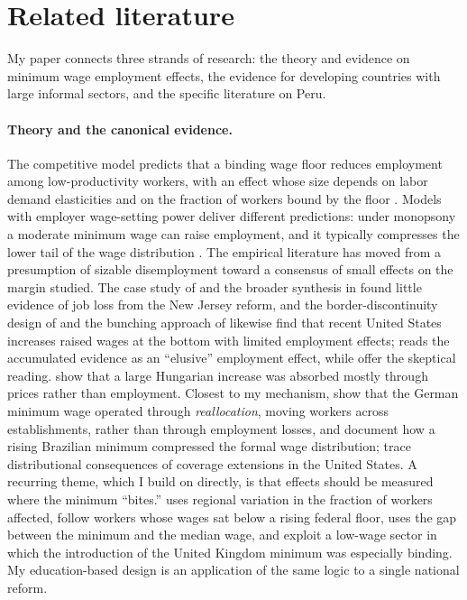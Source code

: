 \section{Related literature}\label{sec:literature}

My paper connects three strands of research: the theory and evidence on minimum wage employment effects, the evidence for developing countries with large informal sectors, and the specific literature on Peru.

\paragraph{Theory and the canonical evidence.} The competitive model predicts that a binding wage floor reduces employment among low-productivity workers, with an effect whose size depends on labor demand elasticities and on the fraction of workers bound by the floor \citep{brown_1999}. Models with employer wage-setting power deliver different predictions: under monopsony a moderate minimum wage can raise employment, and it typically compresses the lower tail of the wage distribution \citep{manning_2003}. The empirical literature has moved from a presumption of sizable disemployment toward a consensus of small effects on the margin studied. The case study of \citet{card_krueger_1994} and the broader synthesis in \citet{card_krueger_1995} found little evidence of job loss from the New Jersey reform, and the border-discontinuity design of \citet{dube_lester_reich_2010} and the bunching approach of \citet{cengiz_2019} likewise find that recent United States increases raised wages at the bottom with limited employment effects; \citet{manning_2021} reads the accumulated evidence as an ``elusive'' employment effect, while \citet{neumark_wascher_2007} offer the skeptical reading. \citet{harasztosi_lindner_2019} show that a large Hungarian increase was absorbed mostly through prices rather than employment. Closest to my mechanism, \citet{dustmann_2022} show that the German minimum wage operated through \emph{reallocation}, moving workers across establishments, rather than through employment losses, and \citet{engbom_moser_2022} document how a rising Brazilian minimum compressed the formal wage distribution; \citet{derenoncourt_montialoux_2021} trace distributional consequences of coverage extensions in the United States. A recurring theme, which I build on directly, is that effects should be measured where the minimum ``bites.'' \citet{card_1992} uses regional variation in the fraction of workers affected, \citet{clemens_wither_2019} follow workers whose wages sat below a rising federal floor, \citet{lee_1999} uses the gap between the minimum and the median wage, and \citet{machin_manning_rahman_2003} exploit a low-wage sector in which the introduction of the United Kingdom minimum was especially binding. My education-based design is an application of the same logic to a single national reform.

